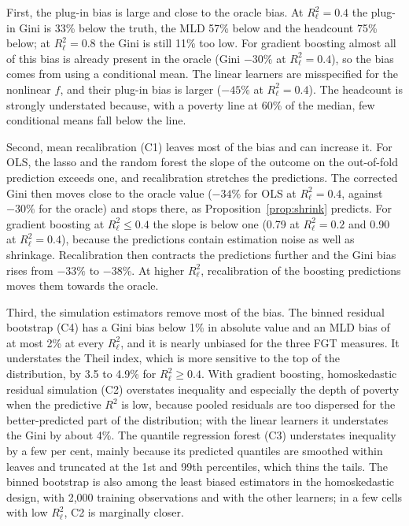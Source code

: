 \documentclass[pdflatex,sn-mathphys-ay]{sn-jnl}
\theoremstyle{thmstyleone}%
\theoremstyle{thmstyletwo}%
\theoremstyle{thmstylethree}%
\begin{document}
First, the plug-in bias is large and close to the oracle bias. At $R^2_\ell=0.4$ the plug-in Gini is 33\% below the truth, the MLD 57\% below and the headcount 75\% below; at $R^2_\ell=0.8$ the Gini is still 11\% too low. For gradient boosting almost all of this bias is already present in the oracle (Gini $-30\%$ at $R^2_\ell=0.4$), so the bias comes from using a conditional mean. The linear learners are misspecified for the nonlinear $f$, and their plug-in bias is larger ($-45\%$ at $R^2_\ell=0.4$). The headcount is strongly understated because, with a poverty line at 60\% of the median, few conditional means fall below the line.

Second, mean recalibration (C1) leaves most of the bias and can increase it. For OLS, the lasso and the random forest the slope of the outcome on the out-of-fold prediction exceeds one, and recalibration stretches the predictions. The corrected Gini then moves close to the oracle value ($-34\%$ for OLS at $R^2_\ell=0.4$, against $-30\%$ for the oracle) and stops there, as Proposition~\ref{prop:shrink} predicts. For gradient boosting at $R^2_\ell\leq 0.4$ the slope is below one (0.79 at $R^2_\ell=0.2$ and 0.90 at $R^2_\ell=0.4$), because the predictions contain estimation noise as well as shrinkage. Recalibration then contracts the predictions further and the Gini bias rises from $-33\%$ to $-38\%$. At higher $R^2_\ell$, recalibration of the boosting predictions moves them towards the oracle.

Third, the simulation estimators remove most of the bias. The binned residual bootstrap (C4) has a Gini bias below 1\% in absolute value and an MLD bias of at most 2\% at every $R^2_\ell$, and it is nearly unbiased for the three FGT measures. It understates the Theil index, which is more sensitive to the top of the distribution, by 3.5 to 4.9\% for $R^2_\ell\geq 0.4$. With gradient boosting, homoskedastic residual simulation (C2) overstates inequality and especially the depth of poverty when the predictive $R^2$ is low, because pooled residuals are too dispersed for the better-predicted part of the distribution; with the linear learners it understates the Gini by about 4\%. The quantile regression forest (C3) understates inequality by a few per cent, mainly because its predicted quantiles are smoothed within leaves and truncated at the 1st and 99th percentiles, which thins the tails. The binned bootstrap is also among the least biased estimators in the homoskedastic design, with 2{,}000 training observations and with the other learners; in a few cells with low $R^2_\ell$, C2 is marginally closer.
\end{document}
